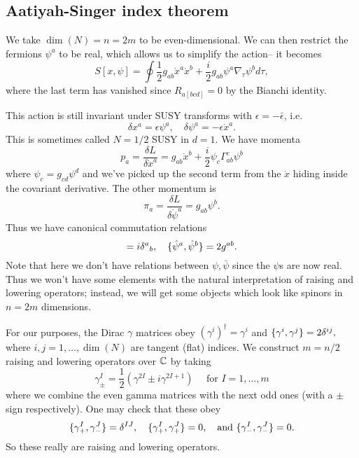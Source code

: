 \subsection*{Aatiyah-Singer index theorem}
We take $\dim(N)=n=2m$ to be even-dimensional. We can then restrict the fermions $\psi^a$ to be real, which allows us to simplify the action-- it becomes
\begin{equation}
    S[x,\psi] = \oint \frac{1}{2} g_{ab} \dot x^a \dot x^b +\frac{i}{2} g_{ab} \psi^a \nabla_\tau \psi^b d\tau,
\end{equation}
where the last term has vanished since $R_{a[bcd]}=0$ by the Bianchi identity.

This action is still invariant under SUSY transforms with $\epsilon=-\bar \epsilon$, i.e.
\begin{equation}
    \delta x^a = \epsilon \psi^a, \quad \delta \psi^a =-\epsilon \dot x^a.
\end{equation}
This is sometimes called $N=1/2$ SUSY in $d=1.$ We have momenta
\begin{equation}
     p_a = \frac{\delta L}{\delta \dot x^a} = g_{ab} \dot x^b +\frac{i}{2} \psi_c \Gamma^c_{ab} \psi^b
\end{equation}
where $\psi_c = g_{cd} \psi^d$ and we've picked up the second term from the $\dot x$ hiding inside the covariant derivative. The other momentum is
\begin{equation}
    \pi_a = \frac{\delta L}{\delta \dot \psi^a} =g_{ab} \psi^b.
\end{equation}
Thus we have canonical commutation relations
\begin{equation}
    [\hat x^a, \hat p_b]=i\delta^a{}_b,\quad \set{\hat \psi^a,\hat \psi^b}=2g^{ab}.
\end{equation}
Note that here we don't have relations between $\psi,\bar \psi$ since the $\psi$s are now real. Thus we won't have some elements with the natural interpretation of raising and lowering operators; instead, we will get some objects which look like spinors in $n=2m$ dimensions.

For our purposes, the Dirac $\gamma$ matrices obey $(\gamma^i)^\dagger = \gamma^i$ and $\{\gamma^i,\gamma^j\}=2\delta^{ij},$ where $i,j=1,\ldots,\dim(N)$ are tangent (flat) indices. We construct $m=n/2$ raising and lowering operators over $\mathbb{C}$ by taking
\begin{equation}
    \gamma^I_\pm =\frac{1}{2} (\gamma^{2I} \pm i \gamma^{2I+1})\quad\text{ for }I=1,\ldots,m
\end{equation}
where we combine the even gamma matrices with the next odd ones (with a $\pm$ sign respectively). One may check that these obey
\begin{equation}
    \{\gamma_+^I, \gamma_-^J\}=\delta^{IJ},\quad \{\gamma_+^I,\gamma_+^J\}=0,\quad\text{and }\{\gamma_-^I,\gamma_-^J\}=0.
\end{equation}
So these really are raising and lowering operators.

